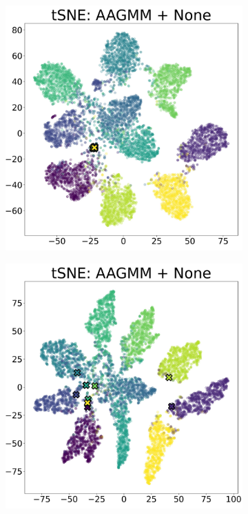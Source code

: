\documentclass[10pt,twocolumn,letterpaper]{article}
\begin{document}
\begin{figure}[h]
	\centering
	\begin{subfigure}[t]{.49\columnwidth}
		\includegraphics[width=\textwidth]{figures/id-00000132-tsne.jpg}
		\subcaption{}
	\end{subfigure}
	\begin{subfigure}[t]{.49\columnwidth}
		\includegraphics[width=\textwidth]{figures/id-00000020-tsne.jpg}

\end{subfigure}
\end{figure}
\end{document}
